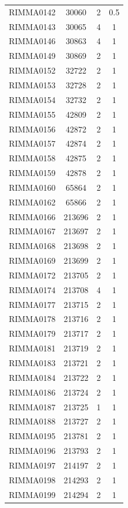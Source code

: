 \documentclass[11pt]{article}
\newcounter{rowno}
\begin{document}
\begin{scriptsize}
\begin{longtable}{>{\stepcounter{rowno}}cccc}
    RIMMA0142 & 30060 & 2     & 0.5 \\
    RIMMA0143 & 30065 & 4     & 1 \\
    RIMMA0146 & 30863 & 4     & 1 \\
    RIMMA0149 & 30869 & 2     & 1 \\
    RIMMA0152 & 32722 & 2     & 1 \\
    RIMMA0153 & 32728 & 2     & 1 \\
    RIMMA0154 & 32732 & 2     & 1 \\
    RIMMA0155 & 42809 & 2     & 1 \\
    RIMMA0156 & 42872 & 2     & 1 \\
    RIMMA0157 & 42874 & 2     & 1 \\
    RIMMA0158 & 42875 & 2     & 1 \\
    RIMMA0159 & 42878 & 2     & 1 \\
    RIMMA0160 & 65864 & 2     & 1 \\
    RIMMA0162 & 65866 & 2     & 1 \\
    RIMMA0166 & 213696 & 2     & 1 \\
    RIMMA0167 & 213697 & 2     & 1 \\
    RIMMA0168 & 213698 & 2     & 1 \\
    RIMMA0169 & 213699 & 2     & 1 \\
    RIMMA0172 & 213705 & 2     & 1 \\
    RIMMA0174 & 213708 & 4     & 1 \\
    RIMMA0177 & 213715 & 2     & 1 \\
    RIMMA0178 & 213716 & 2     & 1 \\
    RIMMA0179 & 213717 & 2     & 1 \\
    RIMMA0181 & 213719 & 2     & 1 \\
    RIMMA0183 & 213721 & 2     & 1 \\
    RIMMA0184 & 213722 & 2     & 1 \\
    RIMMA0186 & 213724 & 2     & 1 \\
    RIMMA0187 & 213725 & 1     & 1 \\
    RIMMA0188 & 213727 & 2     & 1 \\
    RIMMA0195 & 213781 & 2     & 1 \\
    RIMMA0196 & 213793 & 2     & 1 \\
    RIMMA0197 & 214197 & 2     & 1 \\
    RIMMA0198 & 214293 & 2     & 1 \\
    RIMMA0199 & 214294 & 2     & 1 \\

\end{longtable}
\end{scriptsize}
\end{document}
